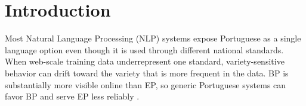 \documentclass[acmtog,nonacm]{acmart}
\begin{document}




\maketitle

\section{Introduction}
Most Natural Language Processing (NLP) systems expose Portuguese as a single
language option even though it is used through different national standards.
When web-scale training data underrepresent one standard, variety-sensitive
behavior can drift toward the variety that is more frequent in the data. BP is substantially more visible online than EP, so generic Portuguese systems can favor BP and serve EP less reliably \citep{Sousa_Almeida_Silvano_Cantante_Campos_Jorge_2025}.
\end{document}
